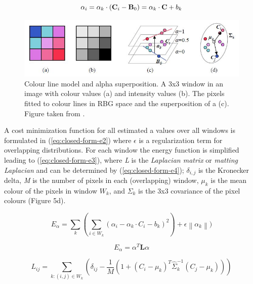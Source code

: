 \begin{equation}\label{eq:closed-form-e1}
\alpha_{i}=\textbf{$\alpha_{k}$}\cdot (\textbf C_{i}-\textbf B_{0})= \alpha _{k} \cdot \textbf{C}+b_{k}
\end{equation}

\begin{figure}[t!]
\centering
\includegraphics[width=1\columnwidth]{Chapter2/2/closed_form_figure_1.jpg}
\caption[Colour line model and alpha superposition.]{Colour line model and alpha superposition. A 3x3 window in an image with colour values (a) and intensity values (b). The pixels fitted to colour lines in RBG space and the superposition of a (c). Figure taken from \cite{algorithmsapplications}.}
\label{fig:closed-form-f1}
\end{figure}

A cost minimization function for all estimated a values over all windows is formulated in (\ref{eq:closed-form-e2}) where $\epsilon$ is a regularization term for overlapping distributions. For each window the energy function is simplified leading to (\ref{eq:closed-form-e3}), where \textit{L} is the \textit{Laplacian matrix} or \textit{matting Laplacian} and can be determined by (\ref{eq:closed-form-e4}); $\delta_{i,j}$ is the Kronecker delta, \textit{M} is the number of pixels in each (overlapping) window, \textit{$\mu_{k}$} is the mean colour of the pixels in window \textit{$W_{k}$}, and \textit{$\Sigma_{k}$} is the 3x3 covariance of the pixel colours (Figure 5d).

\begin{equation} \label{eq:closed-form-e2}
E_{\alpha}=\sum_{k}(\sum_{i\in W_{k}}(\alpha_{i}-\alpha_{k}\cdot C_{i}-b_{k})^2)+\epsilon\left \| \alpha_{k} \right \|)
\end{equation}

\begin{equation} \label{eq:closed-form-e3}
E_{\alpha}=\alpha^T\textbf{L}\alpha
\end{equation}

\begin{equation} \label{eq:closed-form-e4}
L_{ij}=\sum _{k:(i,j)\in W_{k}}(\delta _{ij}-\frac{1}{M}(1+(C_{i}-\mu _{k})^T\hat\Sigma_k ^{-1}(C_{j}-\mu _{k})))
\end{equation}

